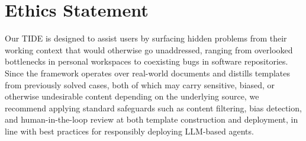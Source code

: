 \section*{Ethics Statement}
Our \textsc{TIDE} is designed to assist users by surfacing hidden problems from their working context that would otherwise go unaddressed, ranging from overlooked bottlenecks in personal workspaces to coexisting bugs in software repositories.
Since the framework operates over real-world documents and distills templates from previously solved cases, both of which may carry sensitive, biased, or otherwise undesirable content depending on the underlying source, we recommend applying standard safeguards such as content filtering, bias detection, and human-in-the-loop review at both template construction and deployment, in line with best practices for responsibly deploying LLM-based agents.
